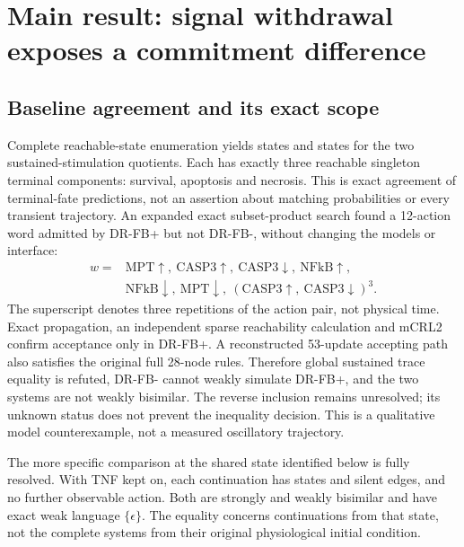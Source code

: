 \section{Main result: signal withdrawal exposes a commitment difference}
\label{sec:death-results}

\subsection{Baseline agreement and its exact scope}

Complete reachable-state enumeration yields \DRBasePlusStates{} states and
\DRBaseMinusStates{} states for the two sustained-stimulation quotients.
Each has exactly three reachable singleton terminal components: survival,
apoptosis and necrosis. This is exact agreement of terminal-fate predictions,
not an assertion about matching probabilities or every transient trajectory.
An expanded exact subset-product search found a 12-action word admitted by
DR-FB+ but not DR-FB-, without changing the models or interface:
\[
\begin{split}
w={}&\mathrm{MPT}\!\uparrow,\ \mathrm{CASP3}\!\uparrow,\
\mathrm{CASP3}\!\downarrow,\ \mathrm{NFkB}\!\uparrow,\\
&\mathrm{NFkB}\!\downarrow,\ \mathrm{MPT}\!\downarrow,\
(\mathrm{CASP3}\!\uparrow,\ \mathrm{CASP3}\!\downarrow)^3 .
\end{split}
\]
The superscript denotes three repetitions of the action pair, not physical
time. Exact propagation, an independent sparse reachability calculation and
mCRL2 confirm acceptance only in DR-FB+. A reconstructed 53-update accepting
path also satisfies the original full 28-node rules. Therefore global
sustained trace equality is refuted, DR-FB- cannot weakly simulate DR-FB+,
and the two systems are not weakly bisimilar. The reverse inclusion remains unresolved;
its unknown status does not prevent the inequality decision. This is a
qualitative model counterexample, not a measured oscillatory trajectory.

The more specific comparison at the shared state identified below is fully
resolved. With TNF kept on, each continuation has \DRLocalBaseStates{} states
and \DRLocalBaseEdges{} silent edges, and no further observable action.
Both are strongly and weakly bisimilar and have exact weak language
$\{\epsilon\}$. The equality concerns continuations from that state, not
the complete systems from their original physiological initial condition.

